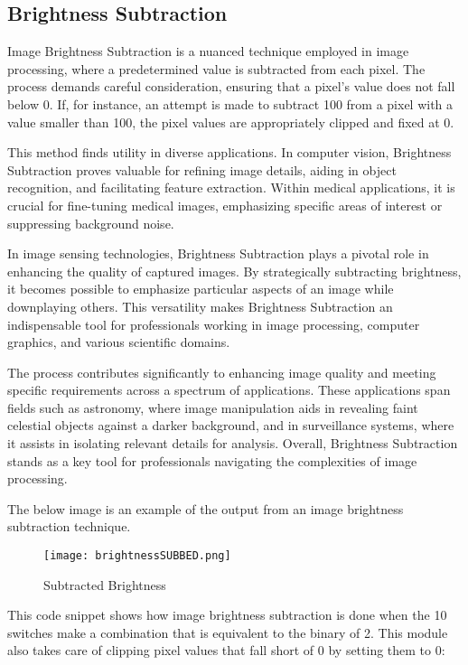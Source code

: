 \subsection{Brightness Subtraction}
\par Image Brightness Subtraction is a nuanced technique employed in image processing, where a predetermined value is subtracted from each pixel. The process demands careful consideration, ensuring that a pixel's value does not fall below 0. If, for instance, an attempt is made to subtract 100 from a pixel with a value smaller than 100, the pixel values are appropriately clipped and fixed at 0. \newline
\par This method finds utility in diverse applications. In computer vision, Brightness Subtraction proves valuable for refining image details, aiding in object recognition, and facilitating feature extraction. Within medical applications, it is crucial for fine-tuning medical images, emphasizing specific areas of interest or suppressing background noise. \newline
\par In image sensing technologies, Brightness Subtraction plays a pivotal role in enhancing the quality of captured images. By strategically subtracting brightness, it becomes possible to emphasize particular aspects of an image while downplaying others. This versatility makes Brightness Subtraction an indispensable tool for professionals working in image processing, computer graphics, and various scientific domains. \newline
\par The process contributes significantly to enhancing image quality and meeting specific requirements across a spectrum of applications. These applications span fields such as astronomy, where image manipulation aids in revealing faint celestial objects against a darker background, and in surveillance systems, where it assists in isolating relevant details for analysis. Overall, Brightness Subtraction stands as a key tool for professionals navigating the complexities of image processing. \newline
\par The below image is an example of the output from an image brightness subtraction technique. \newline
\begin{figure}[H]
    \centering
    \texttt{[image: brightnessSUBBED.png]}
    \caption{Subtracted Brightness}
    \label{fig:imageDarker}  
\end{figure}
\par This code snippet shows how image brightness subtraction is done when the 10 switches make a combination that is equivalent to the binary of 2. This module also takes care of clipping pixel values that fall short of 0 by setting them to 0: \newline

